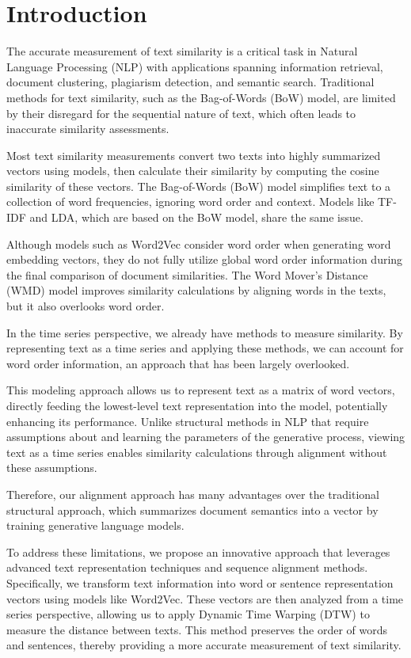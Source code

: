 \documentclass[UTF8]{ctexart}
\begin{document}
\section{Introduction}
 {
  The accurate measurement of text similarity is a critical task in Natural Language Processing (NLP) with applications spanning information retrieval, document clustering, plagiarism detection, and semantic search. Traditional methods for text similarity, such as the Bag-of-Words (BoW) model, are limited by their disregard for the sequential nature of text, which often leads to inaccurate similarity assessments.

  Most text similarity measurements convert two texts into highly summarized vectors using models, then calculate their similarity by computing the cosine similarity of these vectors. The Bag-of-Words (BoW) model simplifies text to a collection of word frequencies, ignoring word order and context. Models like TF-IDF and LDA, which are based on the BoW model, share the same issue.

    Although models such as Word2Vec \cite{ref2} consider word order when generating word embedding vectors, they do not fully utilize global word order information during the final comparison of document similarities. The Word Mover's Distance (WMD) model improves similarity calculations by aligning words in the texts, but it also overlooks word order.

    In the time series perspective, we already have methods to measure similarity. By representing text as a time series and applying these methods, we can account for word order information, an approach that has been largely overlooked.

    This modeling approach allows us to represent text as a matrix of word vectors, directly feeding the lowest-level text representation into the model, potentially enhancing its performance. Unlike structural methods in NLP that require assumptions about and learning the parameters of the generative process, viewing text as a time series enables similarity calculations through alignment without these assumptions.

    
    Therefore, our alignment approach has many advantages over the traditional structural approach, which summarizes document semantics into a vector by training generative language models.

  To address these limitations, we propose an innovative approach that leverages advanced text representation techniques and sequence alignment methods. Specifically, we transform text information into word or sentence representation vectors using models like Word2Vec. These vectors are then analyzed from a time series perspective, allowing us to apply Dynamic Time Warping (DTW) \cite{ref1} to measure the distance between texts. This method preserves the order of words and sentences, thereby providing a more accurate measurement of text similarity.

}
\end{document}

